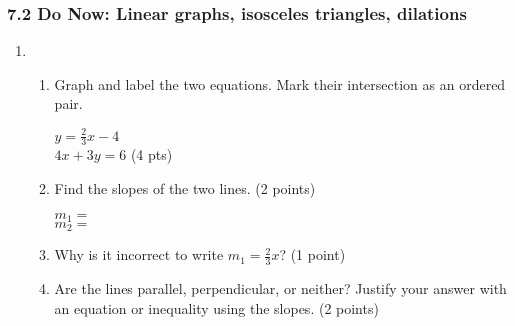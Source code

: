 \documentclass[12pt, twoside]{article}
\begin{document}
\subsubsection*{7.2 Do Now: Linear graphs, isosceles triangles, dilations}
  \begin{enumerate}
  \item \begin{enumerate}
    \item Graph and label the two equations. Mark their intersection as an ordered pair.
      \begin{multicols}{2}
        $y =\frac{2}{3}x-4$ \\
        $4x+3y=6$ \hfill (4 pts)
      \end{multicols}     \vspace{1cm}
    \item Find the slopes of the two lines. \hfill (2 points)
      \begin{multicols}{2}
        $m_1=$ \\
        $m_2=$
      \end{multicols}
    \item Why is it incorrect to write $m_1=\frac{2}{3}x$? \hfill (1 point) \vspace{2cm}
    \item Are the lines parallel, perpendicular, or neither? Justify your answer with an equation or inequality using the slopes. \hfill (2 points)
    \vspace{2cm}
  \end{enumerate}
    \begin{center}
    \end{center}


\end{enumerate}
\end{document}
